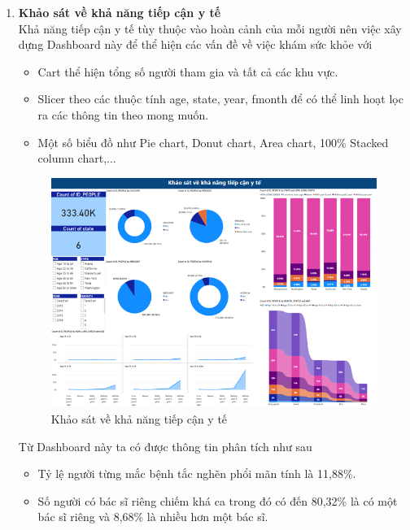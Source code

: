 \begin{enumerate}
    \item \textbf{Khảo sát về khả năng tiếp cận y tế}\\
    Khả năng tiếp cận y tế tùy thuộc vào hoàn cảnh của mỗi người nên việc xây dựng Dashboard này để thể hiện các vấn đề về việc khám sức khỏe với 
    \begin{itemize}[label=$-$]
        \item Cart thể hiện tổng số người tham gia và tất cả các khu vực.
        \item Slicer theo các thuộc tính age, state, year, fmonth để có thể linh hoạt lọc ra các thông tin theo mong muốn.
        \item Một số biểu đồ như Pie chart, Donut chart, Area chart, 100\% Stacked column chart,...
    \end{itemize}
    \begin{center}
            \begin{figure}[!h]
                \centering
                \includegraphics[scale = 0.8]{trang/dashboad2.png}
              \caption{Khảo sát về khả năng tiếp cận y tế}
            \end{figure}
\end{center}
    \newpage
    Từ Dashboard này ta có được thông tin phân tích như sau
    \begin{itemize}[label=$-$]
        \item Tỷ lệ người từng mắc bệnh tắc nghẽn phổi mãn tính là 11,88\%.
        
        \item Số người có bác sĩ riêng chiếm khá ca trong đó có đến 80,32\% là có một bác sĩ riêng và 8,68\% là nhiều hơn một bác sĩ.
        

\end{itemize}
\end{enumerate}
